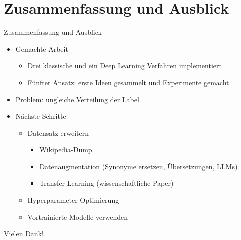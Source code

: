 \documentclass[aspectratio=169]{beamer} %
\begin{document}
\section{Zusammenfassung und Ausblick}
\begin{frame}
    \begin{block}{Zusammenfassung und Ausblick}
        \begin{itemize}
            \item Gemachte Arbeit
            \begin{itemize}
                \item Drei klassische und ein Deep Learning Verfahren implementiert
                
                \item F\"unfter Ansatz: erste Ideen gesammelt und Experimente gemacht
            \end{itemize}

            \pause
            
            \item Problem: ungleiche Verteilung der Label

            \pause
        
            \item N\"achste Schritte
            \begin{itemize}
                \item Datensatz erweitern
                \begin{itemize}
                    \item Wikipedia-Dump
                    
                    \item Datenaugmentation (Synonyme ersetzen, \"Ubersetzungen, LLMs)
                    
                    \item Transfer Learning (wissenschaftliche Paper)
                \end{itemize}
    
                \item Hyperparameter-Optimierung
    
                \item Vortrainierte Modelle verwenden
            \end{itemize}
        \end{itemize}
    \end{block}

    \pause

    Vielen Dank!
\end{frame}
\end{document}
